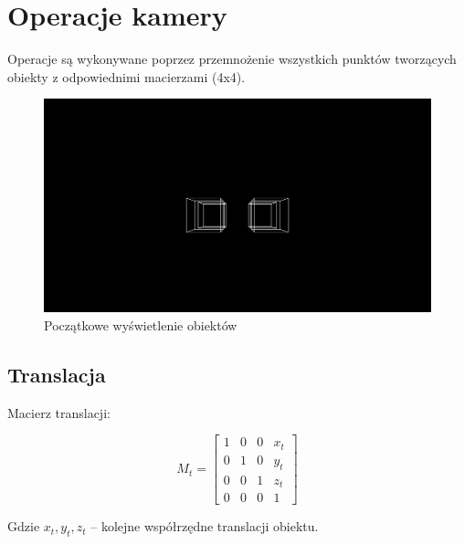 \documentclass{article}
\begin{document}
\section{Operacje kamery}

    Operacje są wykonywane poprzez przemnożenie wszystkich punktów tworzących obiekty
    z odpowiednimi macierzami (4x4).

    \begin{figure}[h]
        \includegraphics[width=\textwidth]{original}
        \caption{Początkowe wyświetlenie obiektów}
        \centering
    \end{figure}

\newpage

    \subsection{Translacja}
    
        Macierz translacji:

        \begin{equation}
            M_t=
            \begin{bmatrix}
                1 & 0 & 0 & x_t \\
                0 & 1 & 0 & y_t \\
                0 & 0 & 1 & z_t \\
                0 & 0 &0 & 1
            \end{bmatrix}
        \end{equation}

        Gdzie \(x_t, y_t, z_t\) -- kolejne współrzędne translacji obiektu.
\end{document}
